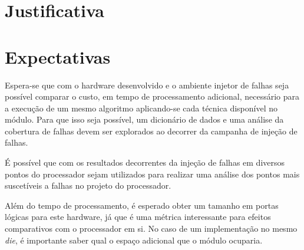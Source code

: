 \section{Justificativa}


\section{Expectativas}
Espera-se que com o hardware desenvolvido e o ambiente injetor de falhas seja possível comparar o custo, em tempo de processamento adicional, necessário para a execução de um mesmo algoritmo aplicando-se cada técnica disponível no módulo. Para que isso seja possível, um dicionário de dados e uma análise da cobertura de falhas devem ser explorados ao decorrer da campanha de injeção de falhas. 

É possível que com os resultados decorrentes da injeção de falhas em diversos pontos do processador sejam utilizados para realizar uma análise dos pontos mais suscetíveis a falhas no projeto do processador. 

Além do tempo de processamento, é esperado obter um tamanho em portas lógicas para este hardware, já que é uma métrica interessante para efeitos comparativos com o processador em si. No caso de um implementação no mesmo \textit{die}, é importante saber qual o espaço adicional que o módulo ocuparia.